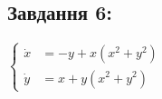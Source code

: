 \subsection{Завдання 6:}

$\left\{\begin{aligned}
    \dot{x} &= -y + x(x^2 + y^2)\\
    \dot{y} &= x +y(x^2 + y^2) 
\end{aligned}\right.$